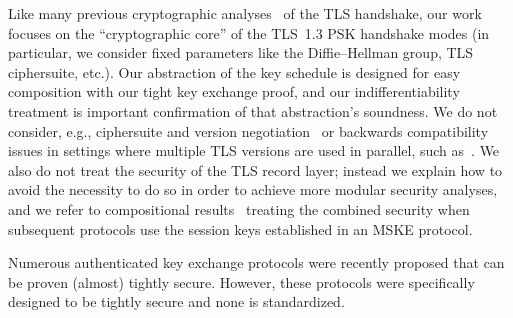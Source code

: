 Like many previous cryptographic analyses~\cite{C:JKSS12,C:KraPatWee13,CCS:DFGS15,EPRINT:DFGS16,EuroSP:FisGue17,JC:DFGS21,JC:DieJag21,ACNS:DavGun21} of the TLS handshake,
our work focuses on the ``cryptographic core'' of the TLS~1.3 PSK handshake modes (in particular, we consider fixed parameters like the Diffie--Hellman group, TLS ciphersuite, etc.).
Our abstraction of the key schedule is designed for easy composition with our tight key exchange proof,
and our indifferentiability treatment is important confirmation of that abstraction's soundness.
We do not consider, e.g., ciphersuite and version negotiation~\cite{ACISP:DowSte15} or backwards compatibility issues in settings where multiple TLS versions are used in parallel, such as~\cite{CCS:JagSchSom15}.
%
We also do not treat the security of the TLS record layer; instead we explain how to avoid the necessity to do so in order to achieve more modular security analyses, and
we refer to compositional results~\cite{CCS:FisGue14,CCS:DFGS15,thesis:Guenther18,JC:DFGS21,JC:DieJag21} treating the combined security when subsequent protocols use the session keys established in an MSKE protocol.

Numerous authenticated key exchange protocols \cite{C:GjoJag18,C:CCGJJ19,AC:LLGW20,EC:JKRS21,C:HJKLPRS21} were recently proposed that can be proven (almost) tightly secure. However, these protocols were specifically designed to be tightly secure and none is standardized.



